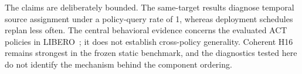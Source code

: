 The claims are deliberately bounded. The same-target results diagnose temporal
source assignment under a policy-query rate of 1, whereas deployment schedules
replan less often. The central behavioral evidence concerns the evaluated ACT
policies in LIBERO~\cite{liu2023libero}; it does not establish cross-policy
generality. Coherent H16 remains strongest in the frozen static benchmark, and
the diagnostics tested here do not identify the mechanism behind the component
ordering.
